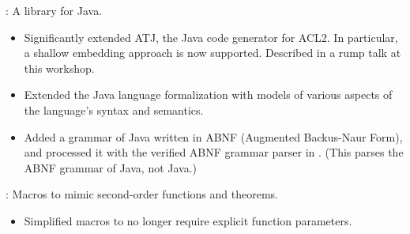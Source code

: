 
\begin{frame}

\implibtitle

:
A library for Java.
\begin{itemize}
\item
Significantly extended ATJ, the Java code generator for ACL2.
In particular, a shallow embedding approach is now supported.
Described in a rump talk at this workshop.
\item
Extended the Java language formalization with models of
various aspects of the language's syntax and semantics.
\item
Added a grammar of Java written in ABNF (Augmented Backus-Naur Form),
and processed it with the verified ABNF grammar parser in .
(This parses the ABNF grammar of Java, not Java.)
\end{itemize}

\end{frame}


\begin{frame}

\implibtitle

:
Macros to mimic second-order functions and theorems.
\begin{itemize}
\item
Simplified macros to no longer require explicit function parameters.
\end{itemize}

\end{frame}


